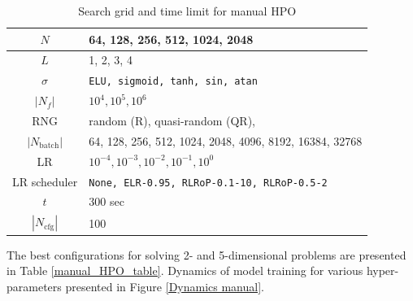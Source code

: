 \documentclass[reprint,
superscriptaddress,
amsmath,amssymb,aps,showkeys,showpacs,
twoside,final,secnumarabic,%
nofootinbib]{revtex4-2}
\begin{document}
\begin{table}[h]
\caption{Search grid and time limit for manual HPO}
\label{manual_HPO_search_grid}
\renewcommand{\arraystretch}{1.25}
\renewcommand{\tabcolsep}{3pt}
\begin{tabular}{|c|p{2in}|}\hline
$N$ & 64, 128, 256, 512, 1024, 2048 \\ \hline
$L$ & 1, 2, 3, 4 \\ \hline
$\sigma$ & \texttt{ELU, sigmoid, tanh, sin, atan} \\ \hline
$|N_f|$ & $10^4, 10^5, 10^6$ \\ \hline
RNG & random (R), quasi-random (QR), \\ \hline
$|N_\mathrm{batch}|$ & 64, 128, 256, 512, 1024, 2048, 4096, 8192, 16384, 32768 \\ \hline
LR & $10^{-4}, 10^{-3}, 10^{-2}, 10^{-1}, 10^0$ \\ \hline
LR scheduler & \texttt{None, ELR-0.95, RLRoP-0.1-10, RLRoP-0.5-2} \\ \hline
$t$ & 300 sec \\ \hline
$|N_\mathrm{cfg}|$ & 100 \\ \hline
\end{tabular}
\end{table}

The best configurations for solving 2- and 5-dimensional problems are presented in Table \ref{manual_HPO_table}.  Dynamics of model training for various hyper-parameters presented in Figure \ref{Dynamics manual}.
\end{document}
